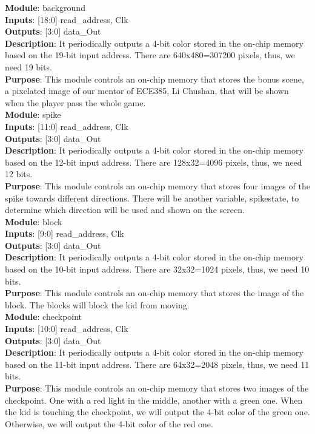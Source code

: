 \documentclass[12pt]{article}
\begin{document}
\textbf{Module}: background \\
\textbf{Inputs}: [18:0] read\_address, Clk \\ 
\textbf{Outputs}: [3:0] data\_Out \\
\textbf{Description}: It periodically outputs a 4-bit color stored in the on-chip memory based on the 19-bit input address. There are 640x480=307200 pixels, thus, we need 19 bits. \\ 
\textbf{Purpose}: This module controls an on-chip memory that stores the bonus scene, a pixelated image of our mentor of ECE385, Li Chushan, that will be shown when the player pass the whole game. \\

\textbf{Module}: spike \\
\textbf{Inputs}: [11:0] read\_address, Clk \\ 
\textbf{Outputs}: [3:0] data\_Out \\
\textbf{Description}: It periodically outputs a 4-bit color stored in the on-chip memory based on the 12-bit input address. There are 128x32=4096 pixels, thus, we need 12 bits. \\ 
\textbf{Purpose}: This module controls an on-chip memory that stores four images of the spike towards different directions. There will be another variable, spikestate, to determine which direction will be used and shown on the screen. \\

\textbf{Module}: block \\
\textbf{Inputs}: [9:0] read\_address, Clk \\ 
\textbf{Outputs}: [3:0] data\_Out \\
\textbf{Description}: It periodically outputs a 4-bit color stored in the on-chip memory based on the 10-bit input address. There are 32x32=1024 pixels, thus, we need 10 bits. \\ 
\textbf{Purpose}: This module controls an on-chip memory that stores the image of the block. The blocks will block the kid from moving. \\

\textbf{Module}: checkpoint \\
\textbf{Inputs}: [10:0] read\_address, Clk \\ 
\textbf{Outputs}: [3:0] data\_Out \\
\textbf{Description}: It periodically outputs a 4-bit color stored in the on-chip memory based on the 11-bit input address. There are 64x32=2048 pixels, thus, we need 11 bits. \\ 
\textbf{Purpose}: This module controls an on-chip memory that stores two images of the checkpoint. One with a red light in the middle, another with a green one. When the kid is touching the checkpoint, we will output the 4-bit color of the green one. Otherwise, we will output the 4-bit color of the red one. \\
\end{document}
